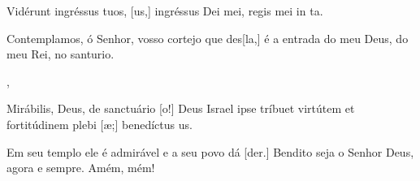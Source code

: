 {    {\item {}Vidérunt ingréssus tuos, [us,] ingréssus Dei mei, regis mei in ta.}%
        {\item {}Contemplamos, ó Senhor, vosso cortejo que des[\-la,] é a entrada do meu Deus, do meu Rei, no santurio.},
    {\item {}Mirábilis, Deus, de sanctuário [o!] Deus Israel ipse tríbuet virtútem et fortitúdinem plebi [æ;] benedíctus us.}%
        {\item {}Em seu templo ele é admirável e a seu povo dá [der.] Bendito seja o Senhor Deus, agora e sempre. Amém, mém!}
}